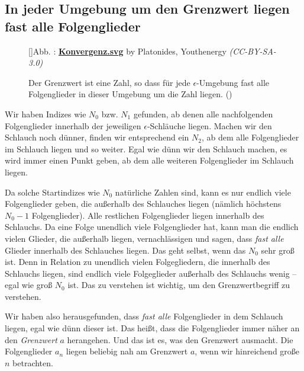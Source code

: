 \documentclass[fontsize=9pt,
               parskip=half-,
               DIV=14,
               listof=chapterentry,
               tocflat]{scrbook}
\newcounter{imagelabel}
\begin{document}
\subsection{In jeder Umgebung um den Grenzwert liegen fast alle Folgenglieder}

\begin{figure}[h]
\vspace{\baselineskip}
[]{Abb. : \protect\href{https://commons.wikimedia.org/wiki/File:Konvergenz.svg}{\textbf{Konvergenz.svg}} by Platonides, Youthenergy \textit{(CC-BY-SA-3.0)}}\centering
{}
\caption*{Der Grenzwert ist eine Zahl, so dass für jede $\epsilon $-Umgebung fast alle Folgenglieder in dieser Umgebung um die Zahl liegen. ()}
\end{figure}
Wir haben Indizes wie $N_{0}$ bzw. $N_{1}$ gefunden, ab denen alle nachfolgenden Folgenglieder innerhalb der jeweiligen $\epsilon $-Schläuche liegen. Machen wir den Schlauch noch dünner, finden wir entsprechend ein $N_{2}$, ab dem alle Folgenglieder im Schlauch liegen und so weiter. Egal wie dünn wir den Schlauch machen, es wird immer einen Punkt geben, ab dem alle weiteren Folgenglieder im Schlauch liegen.

Da solche Startindizes wie $N_{0}$ natürliche Zahlen sind, kann es nur endlich viele Folgenglieder geben, die außerhalb des Schlauches liegen (nämlich höchstens $N_{0}-1$ Folgenglieder). Alle restlichen Folgenglieder liegen innerhalb des Schlauchs. Da eine Folge unendlich viele Folgenglieder hat, kann man die endlich vielen Glieder, die außerhalb liegen, vernachlässigen und sagen, dass \emph{fast alle} Glieder innerhalb des Schlauches liegen. Das geht selbst, wenn das $N_{0}$ sehr groß ist. Denn in Relation zu unendlich vielen Folgegliedern, die innerhalb des Schlauchs liegen, sind endlich viele Folgeglieder außerhalb des Schlauchs wenig – egal wie groß $N_{0}$ ist. Das zu verstehen ist wichtig, um den Grenzwertbegriff zu verstehen.

Wir haben also herausgefunden, dass \emph{fast alle} Folgenglieder in dem Schlauch liegen, egal wie dünn dieser ist. Das heißt, dass die Folgenglieder immer näher an den \emph{Grenzwert} $a$ herangehen. Und das ist es, was den Grenzwert ausmacht. Die Folgenglieder $a_{n}$ liegen beliebig nah am Grenzwert $a$, wenn wir hinreichend große $n$ betrachten.
\end{document}
